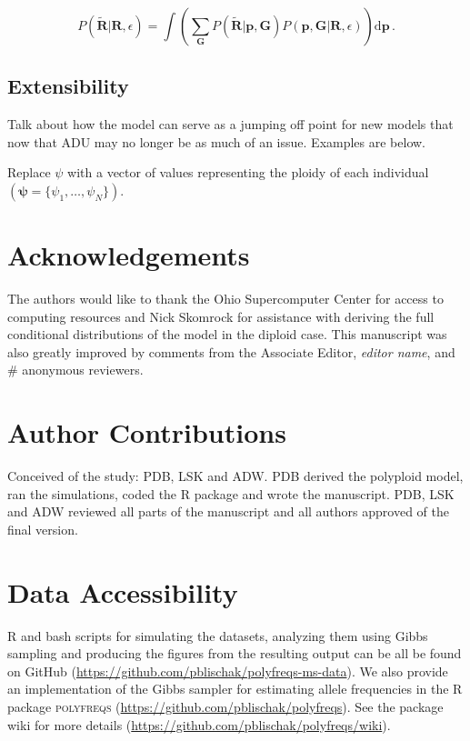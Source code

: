 \documentclass[11pt,english,letterpaper,oneside]{article}
\begin{document}
\begin{equation}
P(\tilde{\bm{R}}|\bm{R},\epsilon) = \displaystyle\int \left(\displaystyle\sum_{\bm{G}} P(\tilde{\bm{R}}|\bm{p},\bm{G}) P(\bm{p},\bm{G}|\bm{R},\epsilon)\right) \text{d}\bm{p}\, .
\end{equation}

\medskip
\subsection*{Extensibility}
\medskip

Talk about how the model can serve as a jumping off point for new models that now that ADU may no longer be as much of an issue. Examples are below.
\medskip

Replace $\psi$ with a vector of values representing the ploidy of each individual $(\bm{\psi} = \{\psi_1,\ldots,\psi_N\})$.
\medskip



\section*{Acknowledgements}           %

The authors would like to thank the Ohio Supercomputer Center for access to computing resources and Nick Skomrock for assistance with deriving the full conditional distributions of the model in the diploid case. This manuscript was also greatly improved by comments from the Associate Editor, \textit{editor name}, and \# anonymous reviewers.
\medskip

\section*{Author Contributions}        %

Conceived of the study: PDB, LSK and ADW. PDB derived the polyploid model, ran the simulations, coded the R package and wrote the manuscript. PDB, LSK and ADW reviewed all parts of the manuscript and all authors approved of the final version.
\medskip

\section*{Data Accessibility}            %

R and bash scripts for simulating the datasets, analyzing them using Gibbs sampling and producing the figures from the resulting output can be all be found on GitHub (\url{https://github.com/pblischak/polyfreqs-ms-data}). We also provide an implementation of the Gibbs sampler for estimating allele frequencies in the R package \textsc{polyfreqs} (\url{https://github.com/pblischak/polyfreqs}). See the package wiki for more details (\url{https://github.com/pblischak/polyfreqs/wiki}).
\vspace{0.5in}
\end{document}
